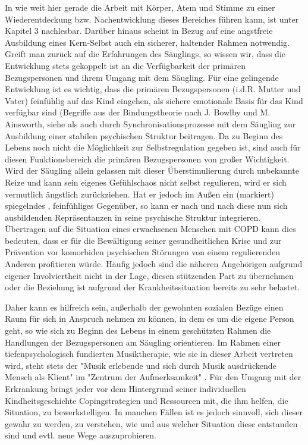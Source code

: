 In wie weit hier gerade die Arbeit mit Körper, Atem und Stimme zu einer Wiederentdeckung bzw. Nachentwicklung dieses Bereiches führen kann, ist unter Kapitel 3 nachlesbar.
Darüber hinaus scheint in Bezug auf eine angstfreie Ausbildung eines Kern-Selbst auch ein sicherer, haltender Rahmen notwendig. Greift man zurück auf die Erfahrungen des Säuglings, so wissen wir, dass die Entwicklung stets gekoppelt ist an die Verfügbarkeit der primären Bezugspersonen und ihrem Umgang mit dem Säugling. Für eine gelingende Entwicklung ist es wichtig, dass die primären Bezugspersonen (i.d.R. Mutter und Vater) feinfühlig auf das Kind eingehen, als sichere emotionale Basis für das Kind verfügbar sind (Begriffe aus der Bindungstheorie nach J. Bowlby und M. Ainsworth, siehe \cite{brisch2013} als auch durch Synchronisationsprozesse mit dem Säugling zur Ausbildung einer stabilen psychischen Struktur beitragen. Da zu Beginn des Lebens noch nicht die Möglichkeit zur Selbstregulation gegeben ist, sind auch für diesen Funktionsbereich die primären Bezugspersonen von großer Wichtigkeit. Wird der Säugling allein gelassen mit dieser Überstimulierung durch unbekannte Reize und kann sein eigenes Gefühlschaos nicht selbst regulieren, wird er sich vermutlich ängstlich zurückziehen. Hat er jedoch im Außen ein (markiert) spiegelndes \autocite[vgl.][153]{fonagy2004}, feinfühliges Gegenüber, so kann er nach und nach diese nun sich ausbildenden Repräsentanzen in seine psychische Struktur integrieren. 
Übertragen auf die Situation eines erwachsenen Menschen mit COPD kann dies bedeuten, dass er für die Bewältigung seiner gesundheitlichen Krise und zur Prävention vor komorbiden psychischen Störungen von einem regulierenden Anderen profitieren würde. Häufig jedoch sind die näheren Angehörigen aufgrund eigener Involviertheit nicht in der Lage, diesen stützenden Part zu übernehmen oder die Beziehung ist aufgrund der Krankheitssituation bereits zu sehr belastet. 

Daher kann es hilfreich sein, außerhalb der gewohnten sozialen Bezüge einen Raum für sich in Anspruch nehmen zu können, in dem es um die eigene Person geht, so wie sich zu Beginn des Lebens in einem geschützten Rahmen die Handlungen der Bezugspersonen am Säugling orientieren. Im Rahmen einer tiefenpsychologisch fundierten Musiktherapie, wie sie in dieser Arbeit vertreten wird, steht stets der "Musik erlebende und sich durch Musik ausdrückende Mensch als Klient" im "Zentrum der Aufmerksamkeit" \autocite[4]{timmermann2004}. Für den Umgang mit der Erkrankung bringt jeder vor dem Hintergrund seiner individuellen Kindheitsgeschichte Copingstrategien und Ressourcen mit, die ihm helfen, die Situation, zu bewerkstelligen. In manchen Fällen ist es jedoch sinnvoll, sich dieser gewahr zu werden, zu verstehen, wie und aus welcher Situation diese entstanden sind und evtl. neue Wege auszuprobieren. 

